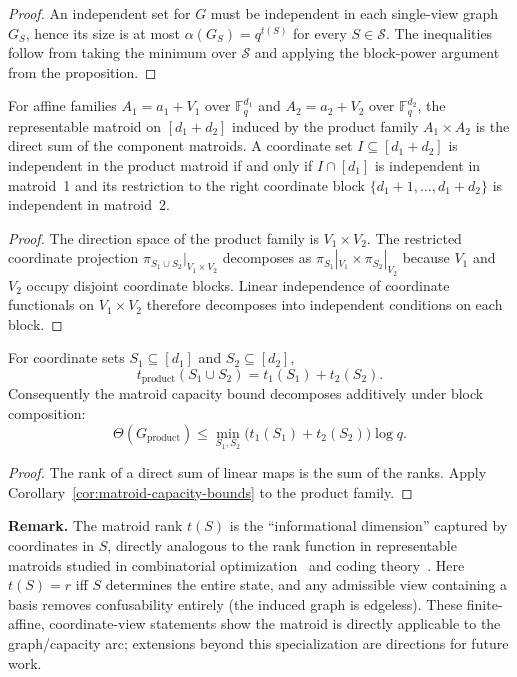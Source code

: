 \begin{proof}
An independent set for $G$ must be independent in each single-view graph $G_S$, hence its size is at most $\alpha(G_S)=q^{t(S)}$ for every $S\in\mathcal S$. The inequalities follow from taking the minimum over $\mathcal S$ and applying the block-power argument from the proposition.
\end{proof}

\begin{proposition}\label{prop:matroid-direct-sum-block}
For affine families $A_1=a_1+V_1$ over $\mathbb F_q^{d_1}$ and $A_2=a_2+V_2$ over $\mathbb F_q^{d_2}$, the representable matroid on $[d_1+d_2]$ induced by the product family $A_1\times A_2$ is the direct sum of the component matroids. A coordinate set $I\subseteq [d_1+d_2]$ is independent in the product matroid if and only if $I\cap [d_1]$ is independent in matroid~1 and its restriction to the right coordinate block $\{d_1+1,\dots,d_1+d_2\}$ is independent in matroid~2.
\end{proposition}

\begin{proof}
The direction space of the product family is $V_1\times V_2$. The restricted coordinate projection $\pi_{S_1\cup S_2}|_{V_1\times V_2}$ decomposes as $\pi_{S_1}|_{V_1}\times \pi_{S_2}|_{V_2}$ because $V_1$ and $V_2$ occupy disjoint coordinate blocks. Linear independence of coordinate functionals on $V_1\times V_2$ therefore decomposes into independent conditions on each block.
\end{proof}

\begin{corollary}\label{cor:rank-additivity-block}
For coordinate sets $S_1\subseteq [d_1]$ and $S_2\subseteq [d_2]$,
\[
t_{\mathrm{product}}(S_1\cup S_2) = t_1(S_1) + t_2(S_2).
\]
Consequently the matroid capacity bound decomposes additively under block composition:
\[
\Theta(G_{\mathrm{product}}) \le \min_{S_1,S_2} \bigl(t_1(S_1) + t_2(S_2)\bigr) \log q.
\]
\end{corollary}

\begin{proof}
The rank of a direct sum of linear maps is the sum of the ranks. Apply Corollary~\ref{cor:matroid-capacity-bounds} to the product family.
\end{proof}

\noindent\textbf{Remark.} The matroid rank $t(S)$ is the ``informational dimension'' captured by coordinates in $S$, directly analogous to the rank function in representable matroids studied in combinatorial optimization~\cite{oxley2011matroid,welsh1976matroid,recski1989matroid} and coding theory~\cite{cover2006elements}. Here $t(S)=r$ iff $S$ determines the entire state, and any admissible view containing a basis removes confusability entirely (the induced graph is edgeless). These finite-affine, coordinate-view statements show the matroid is directly applicable to the graph/capacity arc; extensions beyond this specialization are directions for future work.

